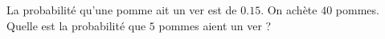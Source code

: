 
\begin{exercice}\label{exosmath-0203}

La probabilité qu'une pomme ait un ver est de \( 0.15\). On achète \( 40\) pommes. Quelle est la probabilité que \( 5\) pommes aient un ver ?

\end{exercice}

